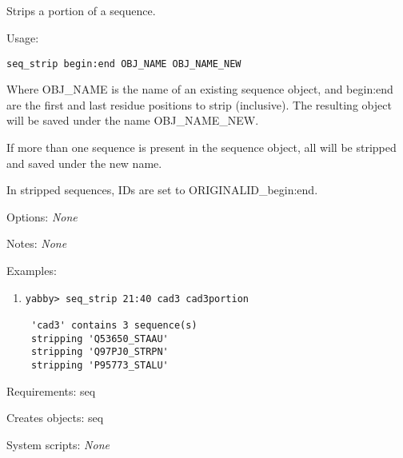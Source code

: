 

\subsection[seq\_strip]{  }



Strips a portion of a sequence.


\begin{description}


\item{Usage:}

{\tt seq\_strip begin:end OBJ\_NAME OBJ\_NAME\_NEW}

Where OBJ\_NAME is the name of an existing sequence object, and
begin:end are the first and last residue positions to strip (inclusive).
The resulting object will be saved under the name OBJ\_NAME\_NEW.

If more than one sequence is present in the sequence object,
all will be stripped and saved under the new name.

In stripped sequences, IDs are set to ORIGINALID\_begin:end.


\item{Options:} {\em None}


\item{Notes:} {\em None}


\item{Examples:}
\begin{enumerate}

\item
\begin{verbatim}
yabby> seq_strip 21:40 cad3 cad3portion

 'cad3' contains 3 sequence(s)
 stripping 'Q53650_STAAU'
 stripping 'Q97PJ0_STRPN'
 stripping 'P95773_STALU'

\end{verbatim}

\end{enumerate}


\item{Requirements:} seq


\item{Creates objects:} seq


\item{System scripts:} {\em None}

\end{description}


